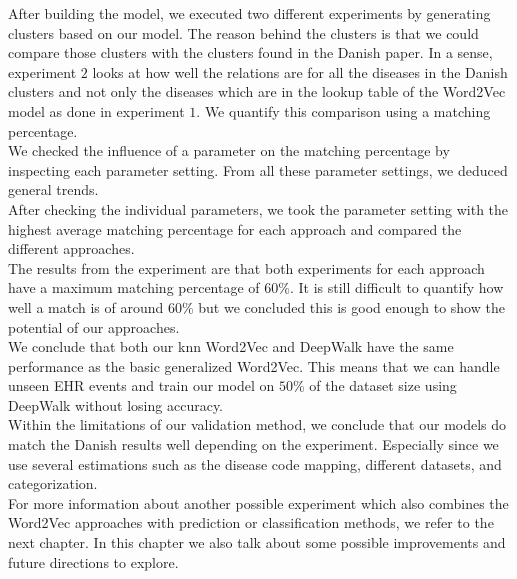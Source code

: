 After building the model, we executed two different experiments by generating clusters based on our model. The reason behind the clusters is that we could compare those clusters with the clusters found in the Danish paper. In a sense, experiment $2$ looks at how well the relations are for all the diseases in the Danish clusters and not only the diseases which are in the lookup table of the Word2Vec model as done in experiment $1$. We quantify this comparison using a matching percentage.  \\
We checked the influence of a parameter on the matching percentage by inspecting each parameter setting. From all these parameter settings, we deduced general trends. \\
After checking the individual parameters, we took the parameter setting with the highest average matching percentage for each approach and compared the different approaches. \\

The results from the experiment are that both experiments for each approach have a maximum matching percentage of $60$\%. It is still difficult to quantify how well a match is of around $60$\% but we concluded this is good enough to show the potential of our approaches. \\

We conclude that both our knn Word2Vec and DeepWalk have the same performance as the basic generalized Word2Vec. This means that we can handle unseen EHR events and train our model on $50$\% of the dataset size using DeepWalk without losing accuracy. \\
Within the limitations of our validation method, we conclude that our models do match the Danish results well depending on the experiment. Especially since we use several estimations such as the disease code mapping, different datasets, and categorization. \\ 

For more information about another possible experiment which also combines the Word2Vec approaches with prediction or classification methods, we refer to the next chapter. In this chapter we also talk about some possible improvements and future directions to explore.

